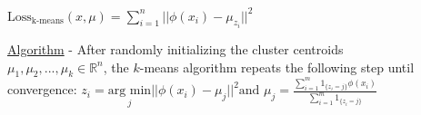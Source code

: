 \documentclass[4pt,landscape]{article}
\begin{document}
\begin{multicols*}{4}
\tiny$ {\textrm{Loss}_{\textrm{k-means}}(x,\mu)=\sum_{i=1}^n||\phi(x_i)-\mu_{z_i}||^2}$

{\tiny \underline{Algorithm} - After randomly initializing the cluster centroids\\ {\tiny$ \mu_1,\mu_2,...,\mu_k\in\mathbb{R}^n$}, the $k$-means algorithm repeats the following step until convergence:}
\tiny ${z_i=\underset{j}{\textrm{arg min}}||\phi(x_i)-\mu_j||^2} \text{and } {\mu_j=\frac{\sum_{i=1}^m1_{\{z_i=j\}}\phi(x_i)}{\sum_{i=1}^m1_{\{z_i=j\}}}}$










\end{multicols*}
\end{document}
